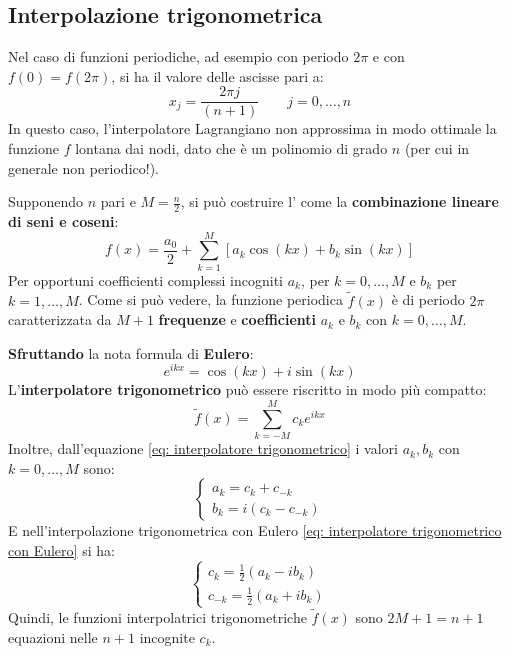 \subsection{Interpolazione trigonometrica}

Nel caso di funzioni periodiche, ad esempio con periodo $2\pi$ e con $f\left(0\right) = f\left(2\pi\right)$, si ha il valore delle ascisse pari a:
\begin{equation*}
	x_{j} = \dfrac{2\pi j}{\left(n+1\right)} \hspace{2em} j = 0, \dots, n
\end{equation*}
In questo caso, l'interpolatore Lagrangiano non approssima in modo ottimale la funzione $f$ lontana dai nodi, dato che è un polinomio di grado $n$ (per cui in generale non periodico!).

\highspace
Supponendo $n$ pari e $M = \frac{n}{2}$, si può costruire l' come la \textbf{combinazione lineare di seni e coseni}:
\begin{equation}\label{eq: interpolatore trigonometrico}
	f\left(x\right) = \dfrac{a_{0}}{2} + \displaystyle\sum_{k=1}^{M} \left[a_{k} \cos\left(kx\right) + b_{k} \sin\left(kx\right)\right]
\end{equation}
Per opportuni coefficienti complessi incogniti $a_{k}$, per $k = 0, \dots, M$ e $b_{k}$ per $k = 1, \dots, M$. Come si può vedere, la funzione periodica $\tilde{f}\left(x\right)$ è di periodo $2\pi$ caratterizzata da $M+1$ \textbf{frequenze} e \textbf{coefficienti} $a_{k}$ e $b_{k}$ con $k = 0, \dots, M$.

\highspace
\textbf{Sfruttando} la nota formula di \textbf{Eulero}:
\begin{equation*}
	e^{ikx} = \cos\left(kx\right) + i\sin\left(kx\right)
\end{equation*}
L'\textbf{interpolatore trigonometrico} può essere riscritto in modo più compatto:
\begin{equation}\label{eq: interpolatore trigonometrico con Eulero}
	\tilde{f}\left(x\right) = \displaystyle\sum_{k = -M}^{M} c_{k} e^{ikx}
\end{equation}
Inoltre, dall'equazione \ref{eq: interpolatore trigonometrico} i valori $a_{k}, b_{k}$ con $k = 0, \dots, M$ sono:
\begin{equation*}
	\begin{cases}
		a_{k} = c_{k} + c_{-k} \\
		b_{k} = i\left(c_{k} - c_{-k}\right)
	\end{cases}
\end{equation*}
E nell'interpolazione trigonometrica con Eulero \ref{eq: interpolatore trigonometrico con Eulero} si ha:
\begin{equation*}
	\begin{cases}
		c_{k} = \frac{1}{2}\left(a_{k} - ib_{k}\right) \\
		c_{-k} = \frac{1}{2}\left(a_{k} + ib_{k}\right)
	\end{cases}
\end{equation*}
Quindi, le funzioni interpolatrici trigonometriche $\tilde{f}\left(x\right)$ sono $2M+1 = n+1$ equazioni nelle $n+1$ incognite $c_{k}$.

